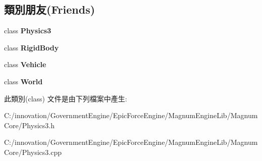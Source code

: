 \subsection*{類別朋友(Friends)}
\begin{DoxyCompactItemize}
\item 
class {\bfseries Physics3}\hypertarget{class_i_dream_sky_1_1_physics3_1_1_manager_a61d0ff9334956c92044d28d3755e8c83}{}\label{class_i_dream_sky_1_1_physics3_1_1_manager_a61d0ff9334956c92044d28d3755e8c83}

\item 
class {\bfseries Rigid\+Body}\hypertarget{class_i_dream_sky_1_1_physics3_1_1_manager_abb8b03bec6b0a8e0834c8358c93039d2}{}\label{class_i_dream_sky_1_1_physics3_1_1_manager_abb8b03bec6b0a8e0834c8358c93039d2}

\item 
class {\bfseries Vehicle}\hypertarget{class_i_dream_sky_1_1_physics3_1_1_manager_a74c93d9d035fcad5381bfb57de0426a1}{}\label{class_i_dream_sky_1_1_physics3_1_1_manager_a74c93d9d035fcad5381bfb57de0426a1}

\item 
class {\bfseries World}\hypertarget{class_i_dream_sky_1_1_physics3_1_1_manager_a7b4bcdf992c21ae83363f25df05b1d25}{}\label{class_i_dream_sky_1_1_physics3_1_1_manager_a7b4bcdf992c21ae83363f25df05b1d25}

\end{DoxyCompactItemize}


此類別(class) 文件是由下列檔案中產生\+:\begin{DoxyCompactItemize}
\item 
C\+:/innovation/\+Government\+Engine/\+Epic\+Force\+Engine/\+Magnum\+Engine\+Lib/\+Magnum\+Core/Physics3.\+h\item 
C\+:/innovation/\+Government\+Engine/\+Epic\+Force\+Engine/\+Magnum\+Engine\+Lib/\+Magnum\+Core/Physics3.\+cpp\end{DoxyCompactItemize}
